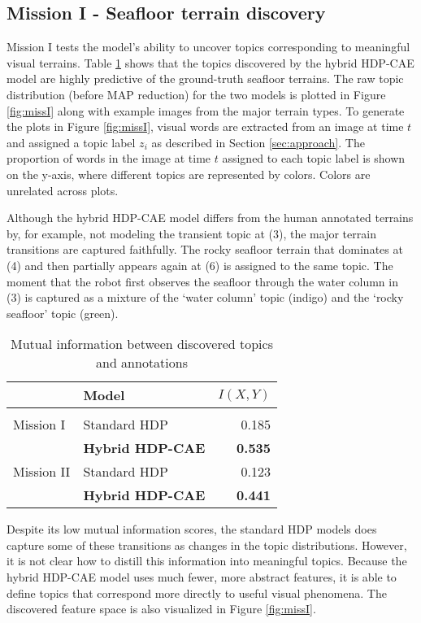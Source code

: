 \documentclass[letterpaper, 10 pt, conference]{ieeeconf}
\begin{document}
\subsection{Mission I - Seafloor terrain discovery}
Mission I tests the model's ability to uncover topics corresponding to meaningful visual terrains. Table \ref{tab:mutualinf} shows that the topics discovered by the hybrid HDP-CAE model are highly predictive of the ground-truth seafloor terrains. The raw topic distribution (before MAP reduction) for the two models is plotted in Figure \ref{fig:missI} along with example images from the major terrain types. To generate the plots in Figure \ref{fig:missI}, visual words are extracted from an image at time $t$ and assigned a topic label $z_i$ as described in Section \ref{sec:approach}. The proportion of words in the image at time $t$ assigned to each topic label is shown on the y-axis, where different topics are represented by colors. Colors are unrelated across plots.

Although the hybrid HDP-CAE model differs from the human annotated terrains by, for example, not modeling the transient topic at (3), the major terrain transitions are captured faithfully. The rocky seafloor terrain that dominates at (4) and then partially appears again at (6) is assigned to the same topic. The moment that the robot first observes the seafloor through the water column in (3) is captured as a mixture of the `water column' topic (indigo) and the `rocky seafloor' topic (green).

\begin{table}[htb!]
\caption{Mutual information between \hspace{\textwidth} discovered topics
        and annotations}
\label{tab:mutualinf}
\centering
\begin{tabular}{ll|r}
     & Model & $I(X, Y)$ \\ \hline \\
    Mission I & Standard HDP &    0.185\\
     &   \textbf{Hybrid HDP-CAE} &   \textbf{0.535} \\
    Mission II &   Standard HDP &    0.123 \\
     &   \textbf{Hybrid HDP-CAE}  &   \textbf{0.441} \\ 
\end{tabular}
\end{table}
    
Despite its low mutual information scores, the standard HDP models does capture some of these transitions as changes in the topic distributions. However, it is not clear how to distill this information into meaningful topics. Because the hybrid HDP-CAE model uses much fewer, more abstract features, it is able to define topics that correspond more directly to useful visual phenomena. The discovered feature space is also visualized in Figure \ref{fig:missI}.
\end{document}
